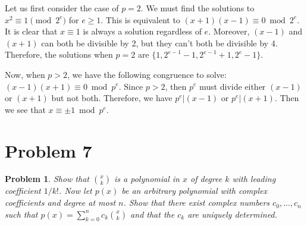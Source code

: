 \documentclass[psamsfonts]{amsart}
\newtheorem{prob}{Problem}[section]
\newenvironment{sol}{{\bfseries Solution}}{\qedsymbol}
\theoremstyle{definition}
\theoremstyle{remark}
\numberwithin{equation}{section}
\begin{document}
\begin{sol}
Let us first consider the case of $p=2$. We must find the solutions to $x^2 \equiv 1 \pmod{2^e}$ for $e \geq 1$. This is equivalent to $(x+1)(x-1) \equiv 0 \bmod{2^e}$. It is clear that $x \equiv 1$ is always a solution regardless of $e$. Moreover, $(x-1)$ and $(x+1)$ can both be divisible by 2, but they can't both be divisible by 4. Therefore, the solutions when $p=2$ are $\{1, 2^{e-1} - 1, 2^{e-1} + 1, 2^{e} - 1\}$.

Now, when $p > 2$, we have the following congruence to solve: $(x-1)(x+1) \equiv 0 \bmod{p^e}$. Since $p > 2$, then $p^e$ must divide either $(x-1)$ or $(x+1)$ but not both. Therefore, we have $p^e | (x-1)$ or $p^e | (x+1)$. Then we see that $x \equiv \pm 1 \bmod{p^e}$. 
\end{sol}

\section{Problem 7}

\begin{prob}
Show that ${ x \choose k}$ is a polynomial in $x$ of degree $k$ with leading coefficient $1/k!$. Now let $p(x)$ be an arbitrary polynomial with complex coefficients and degree at most $n$. Show that there exist complex numbers $c_0, \ldots, c_n$ such that $p(x) = \sum_{k=0}^n c_k {x \choose k}$ and that the $c_k$ are uniquely determined.
\end{prob}
\end{document}
